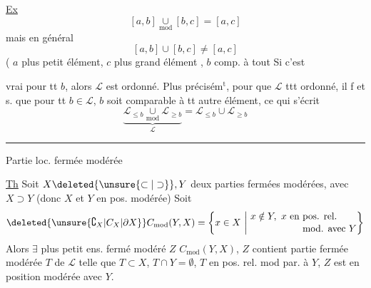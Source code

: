 \uline{Ex}
\[
[a,b]\underset{\mathrm{mod}}{\cup}[b,c]=[a,c]
\]
mais en général
\[
[a,b]\cup[b,c]\ne[a,c]
\]
( $a$ plus  petit élément, $c$ plus grand élément   , $b$  comp. à tout  Si c'est

vrai pour tt $b$, alors $\mathcal L$ est  ordonné. Plus précisém$^{\mathrm t}$, pour que $\mathcal L$ ttt ordonné, il f et s. que pour tt $b\in\mathcal L$, $b$ soit comparable à tt autre élément, ce qui s'écrit
\[
\underbrace{\mathcal L_{\leq b}\underset{\mathrm{mod}}{\cup}\mathcal L_{\geq b}}_{\mathcal L}=\mathcal L_{\leq b}\cup \mathcal L_{\geq b}
\]
\begin{center}\rule{2.5cm}{0.35pt}\end{center}

Partie loc. fermée modérée

\uline{Th} Soit $X\deleted{\unsure{\subset|\supset}},Y$ deux parties fermées modérées, avec $X\supset Y$ (donc $X$ et $Y$ en pos.  modérée)
 
Soit
\[
\deleted{\unsure{\complement_X|C_X|\partial X}} C_{\mathrm{mod}}(Y,X)=\left\{x\in X\ \middle|\ 
\begin{aligned}&x\notin Y,\ x\text{ en pos. rel.}\\[-2pt]&\hphantom{x\notin Y,\ x\text{ en }}\text{mod. avec }Y\end{aligned}\right\}
\]
Alors $\exists$ plus petit ens. fermé modéré $Z$    $C_{\mathrm{mod}}(Y,X)$,  $Z$  contient  partie fermée modérée $T$ de $\mathcal L$ telle que $T\subset X$, $T\cap Y=\emptyset$, $T$ en pos. rel. mod par.  à $Y$,  $Z$ est en position modérée avec $Y$.

